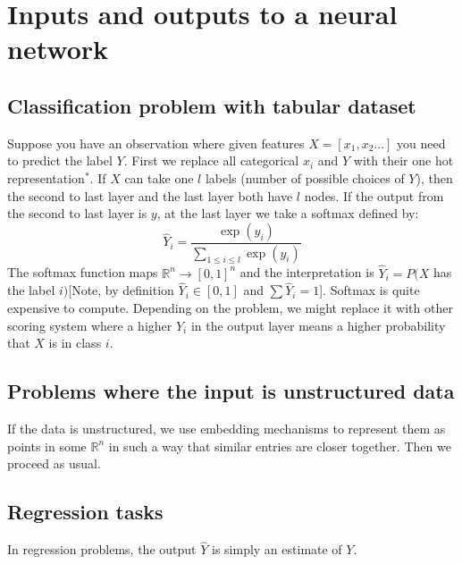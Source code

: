 \section{Inputs and outputs to a neural network}
\subsection{Classification problem with tabular dataset}
Suppose you have an observation where given features $X=[x_1,x_2\hdots]$ you need to predict the label $Y$. First we replace all categorical $x_i$ and $Y$ with their one hot representation$^{*}$. If $X$ can take  one $l$ labels (number of possible choices of $Y$), then the second to last layer and the last layer both  have $l$ nodes. If the output from the second to last layer is $y$, at the last layer we take a softmax defined by:
$$\hat Y_i=\frac{\exp(y_i)}{\sum_{1\leq i\leq l}\exp(y_i)}$$
The softmax function maps $\mathbb R^n\to [0,1]^n$ and the interpretation is $\hat Y_i=P(X$ has the label $i)$[Note, by definition $\hat Y_i\in[0,1]$ and  $\sum \hat Y_i=1$]. Softmax is quite expensive to compute. Depending on the problem, we might replace it with other scoring system where a higher $\hat Y_i$ in the output layer means a higher probability that $X$ is in class $i$.

\subsection{Problems where the input is unstructured data}
If the data is unstructured, we use embedding mechanisms to represent them as points in some $\mathbb R^n$ in such a way that similar entries are closer together. Then we proceed as usual. 
\subsection{Regression tasks}
In regression problems, the output $\hat Y$ is simply an estimate of $Y$.
